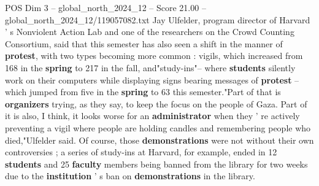 \begin{textsample}{POS Dim 3 – global\_north\_2024\_12 – Score 21.00 – global\_north\_2024\_12/119057082.txt}
Jay Ulfelder, program director of Harvard ' s Nonviolent Action Lab and one of the researchers on the Crowd Counting Consortium, said that this semester has also seen a shift in the manner of \textbf{protest}, with two types becoming more common : vigils, which increased from 168 in the \textbf{spring} to 217 in the fall, and"study-ins"-- where \textbf{students} silently work on their computers while displaying signs bearing messages of \textbf{protest} -- which jumped from five in the \textbf{spring} to 63 this semester."Part of that is \textbf{organizers} trying, as they say, to keep the focus on the people of Gaza.
Part of it is also, I think, it looks worse for an \textbf{administrator} when they ' re actively preventing a vigil where people are holding candles and remembering people who died,"Ulfelder said.
Of course, those \textbf{demonstrations} were not without their own controversies ; a series of study-ins at Harvard, for example, ended in 12 \textbf{students} and 25 \textbf{faculty} members being banned from the library for two weeks due to the \textbf{institution} ' s ban on \textbf{demonstrations} in the library.

\end{textsample}
